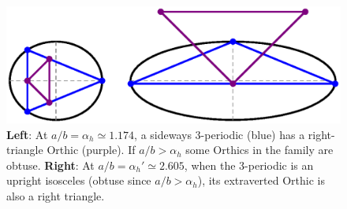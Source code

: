 

\begin{figure}
    \centering
    \includegraphics[width=.6\textwidth]{pics/1040_orthic_right_triangle}
    \caption{\textbf{Left}: At $a/b=\alpha_h{\simeq}1.174$, a sideways 3-periodic (blue) has a right-triangle Orthic (purple). If $a/b>\alpha_h$ some Orthics in the family are obtuse. \textbf{Right}: At $a/b=\alpha_h'{\simeq}2.605$, when the 3-periodic is an upright isosceles (obtuse since $a/b>\alpha_h$), its extraverted Orthic is also a right triangle.}
    \label{fig:right-orthic}
\end{figure}